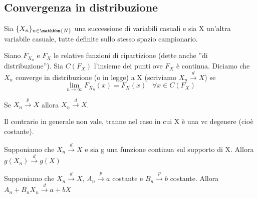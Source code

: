 \subsection{Convergenza in distribuzione}
\begin{dfn}

Sia $\{X_n\}_{n\in\mathbbm{N}}$ una successione di variabili casuali e 
sia X un'altra variabile casuale, tutte definite sullo stesso spazio campionario.

Siano $F_{X_n}$ e $F_X$ le relative funzioni di ripartizione (dette anche ''di distribuzione'').
Sia $C(F_X)$ l'insieme dei punti ove $F_X$ è continua. 
Diciamo che $X_n$ converge in distribuzione (o in legge) a X (scriviamo $X_n\stackrel{d}{\rightarrow}X$) se 
$$\lim_{n \rightarrow\infty} F_{X_n}(x)=F_X(x) \; \; \; \forall x \in C(F_X)$$
\end{dfn}

\begin{thm}
Se $X_n\stackrel{p}{\rightarrow}X$ allora $X_n\stackrel{d}{\rightarrow}X$.
\end{thm}
\begin{oss}
Il contrario in generale non vale, tranne nel caso in cui X è una vc degenere (cioè costante).
\end{oss}
\begin{thm} Supponiamo che $X_n\stackrel{d}{\rightarrow}X$ e sia g una funzione continua sul supporto di X. Allora $g(X_n)\stackrel{d}{\rightarrow}g(X)$
\end{thm}
\begin{thm} [Slutsky] Supponiamo che $X_n\stackrel{d}{\rightarrow}X$, $A_n\stackrel{p}{\rightarrow}a$ costante e $B_n\stackrel{p}{\rightarrow}b$ costante. Allora $A_n+B_n X_n\stackrel{d}{\rightarrow}a+bX$
\end{thm}
